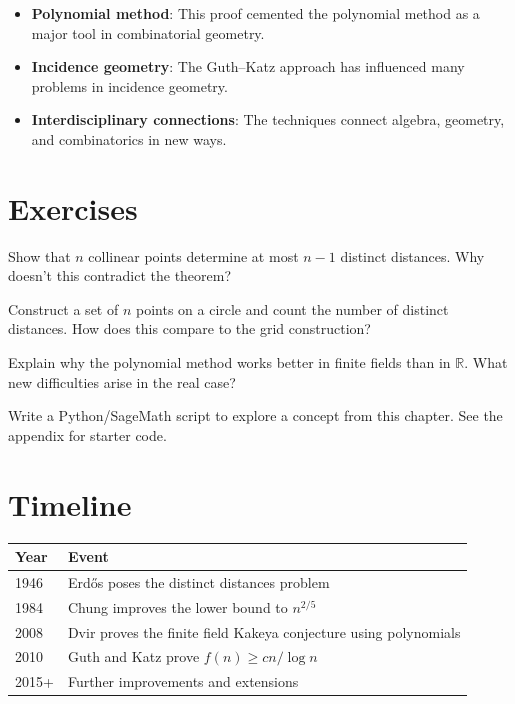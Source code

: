 \begin{itemize}
\item \textbf{Polynomial method}: This proof cemented the polynomial method as a major tool in combinatorial geometry.
\item \textbf{Incidence geometry}: The Guth--Katz approach has influenced many problems in incidence geometry.
\item \textbf{Interdisciplinary connections}: The techniques connect algebra, geometry, and combinatorics in new ways.
\end{itemize}

\section{Exercises}

\begin{exercise}[Basic]
Show that $n$ collinear points determine at most $n-1$ distinct distances. Why doesn't this contradict the theorem?
\end{exercise}

\begin{exercise}[Intermediate]
Construct a set of $n$ points on a circle and count the number of distinct distances. How does this compare to the grid construction?
\end{exercise}

\begin{exercise}[Challenge]
Explain why the polynomial method works better in finite fields than in $\mathbb{R}$. What new difficulties arise in the real case?
\end{exercise}


\begin{exercise}[Computational]
Write a Python/SageMath script to explore a concept from this chapter. See the appendix for starter code.
\end{exercise}

\section{Timeline}

\begin{tabularx}{\linewidth}{lX}
\toprule
\textbf{Year} & \textbf{Event} \\ \midrule
1946 & Erd\H{o}s poses the distinct distances problem \cite{erdos1946} \\ 
1984 & Chung improves the lower bound to $n^{2/5}$ \cite{chung1984} \\ 
2008 & Dvir proves the finite field Kakeya conjecture using polynomials \cite{dvir2009} \\ 
2010 & Guth and Katz prove $f(n) \geq cn/\log n$ \cite{guth2015} \\ 
2015+ & Further improvements and extensions \\ \bottomrule
\end{tabularx}

